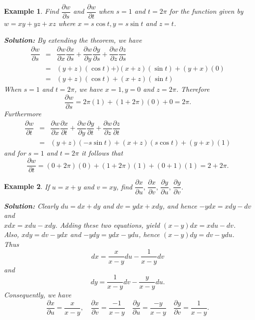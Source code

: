 \documentclass[titlepage,a4paper,12pt]{report}
\newtheorem{example}{Example}[section]
\begin{document}
\begin{example}
Find $\dfrac{\partial w}{\partial s}$ and $\dfrac{\partial w}{\partial t}$ when $s=1$ and $t=2\pi$ for the function given by $w=xy+yz+xz$ where $x=s\cos t, y=s\sin t$ and $z=t$.

\noindent \textbf{Solution:} By extending the theorem, we have 
\begin{eqnarray*}
\dfrac{\partial w}{\partial s} &=& \dfrac{\partial w}{\partial x} \dfrac{\partial x}{\partial s}+\dfrac{\partial w}{\partial y}\dfrac{\partial y}{\partial s} +\dfrac{\partial w}{\partial z}\dfrac{\partial z}{\partial s}\\
&=& (y+z)(\cos t)+)(x+z)(\sin t) +(y+x)(0)\\
&=& (y+z)(\cos t)+(x+z)(\sin t)
\end{eqnarray*}
When $s=1$ and $t=2\pi$, we have $x=1, y=0$ and $z=2\pi$. Therefore 
\[\dfrac{\partial w}{\partial s}=2\pi(1)+(1+2\pi)(0)+0=2\pi.\]
Furthermore 
\begin{eqnarray*}
\dfrac{\partial w}{\partial t} &=& \dfrac{\partial w}{\partial x} \dfrac{\partial x}{\partial t}+\dfrac{\partial w}{\partial y}\dfrac{\partial y}{\partial t}+\dfrac{\partial w}{\partial z}\dfrac{\partial z}{\partial t}\\
&=& (y+z)(-s\sin t) +(x+z)(s\cos t)+(y+x)(1)
\end{eqnarray*}
and for $s=1$ and $t=2\pi$ it follows that 
\[\dfrac{\partial w}{\partial t}= (0+2\pi)(0)+(1+2\pi)(1)+(0+1)(1)=2+2\pi.\]
\end{example}
\begin{example}
If $u=x+y$ and $v=xy$, find $\dfrac{\partial x}{\partial u},\, \dfrac{\partial x }{\partial v},\,  \dfrac{\partial y}{\partial u},\,  \dfrac{\partial y}{\partial v}$.

\noindent \textbf{Solution:} Clearly $du=dx +dy$ and $dv=ydx+xdy$, and hence $-ydx=xdy-dv$ and \\$xdx=xdu-xdy$. Adding these two equations, yield $(x-y)dx=xdu-dv$. Also, $xdy=dv-ydx$ and $-ydy=ydx-ydu$, hence $(x-y)dy=dv-ydu$. Thus 
\[dx=\dfrac{x}{x-y}du-\dfrac{1}{x-y}dv\] and 
\[dy=\dfrac{1}{x-y}dv-\dfrac{y}{x-y}du.\] Consequently, we have 
\[\dfrac{\partial x}{\partial u}=\dfrac{x}{x-y}, \quad \dfrac{\partial x}{\partial v}=\dfrac{-1}{x-y} \quad \dfrac{\partial y}{\partial u}=\dfrac{-y}{x-y} \quad \dfrac{\partial y}{\partial v}=\dfrac{1}{x-y}.\]
\end{example}
\end{document}

